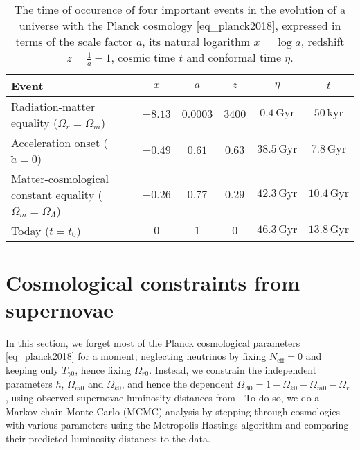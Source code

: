 \documentclass[10pt,a4paper]{article}
\begin{document}
\begin{table}
\centering
\caption{%
	The time of occurence of four important events in the evolution of a universe with the Planck cosmology \eqref{eq_planck2018},
	expressed in terms of the scale factor $a$, its natural logarithm $x = \log a$, redshift $z = \frac1a - 1$, cosmic time $t$ and conformal time $\eta$.
}
\label{table_times}
\begin{tabular}{l c c c c c}
	\toprule
	Event                                                               & $x$     & $a$       & $z$    & $\eta$    & $t$ \\
	\midrule
	Radiation-matter equality ($\Omega_r = \Omega_m$)                   & $-8.13$ & $0.0003$  & $3400$ & $0.4\,\mathrm{Gyr}$ & $50\,\mathrm{kyr}$ \\
	Acceleration onset ($\ddot{a} = 0$)                                 & $-0.49$ & $0.61$    & $0.63$ & $38.5\,\mathrm{Gyr}$ & $7.8\,\mathrm{Gyr}$   \\
	Matter-cosmological constant equality ($\Omega_m = \Omega_\Lambda$) & $-0.26$ & $0.77$    & $0.29$ & $42.3\,\mathrm{Gyr}$ & $10.4\,\mathrm{Gyr}$  \\
	Today ($t = t_0$)                                                   & $0$     & $1$       & $0$    & $46.3\,\mathrm{Gyr}$ & $13.8\,\mathrm{Gyr}$  \\
	\bottomrule
\end{tabular}
\end{table}

\clearpage

\section{Cosmological constraints from supernovae}
\label{sec_supernova}

In this section, we forget most of the Planck cosmological parameters \eqref{eq_planck2018} for a moment;
neglecting neutrinos by fixing $N_\text{eff}=0$ and keeping only $T_{\gamma0}$, hence fixing $\Omega_{r0}$.
Instead, we constrain the independent parameters $h$, $\Omega_{m0}$ and $\Omega_{k0}$,
and hence the dependent $\Omega_{\Lambda 0}=1-\Omega_{k0}-\Omega_{m0}-\Omega_{r0}$,
using observed supernovae luminosity distances from \cite{betouleImprovedCosmologicalConstraints2014}.
To do so, we do a Markov chain Monte Carlo (MCMC) analysis
by stepping through cosmologies with various parameters using the Metropolis-Hastings algorithm
and comparing their predicted luminosity distances to the data.
\end{document}
